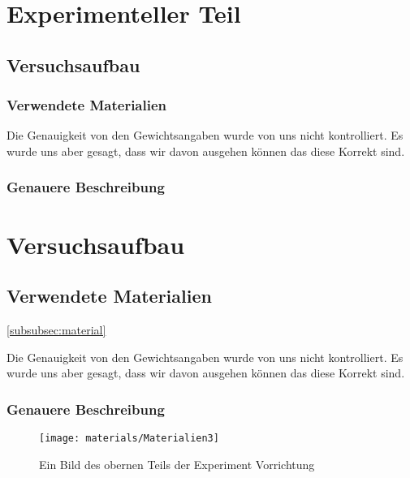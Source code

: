 \documentclass[../main.tex]{subfiles} %
\begin{document}
\section{Experimenteller Teil}\label{sec:experimenteller-teil}
    \subsection{Versuchsaufbau}\label{subsec:versuchsaufbau}
        \subsubsection{Verwendete Materialien}\label{subsubsec:zu-der-materialliste}
        \begin{tcolorbox}[title=Hinweis zu den Gewichtsangeben]
            Die Genauigkeit von den Gewichtsangaben wurde von uns nicht kontrolliert.
            Es wurde uns aber gesagt, dass wir davon ausgehen können das diese Korrekt sind.
        \end{tcolorbox}
        \subsubsection{Genauere Beschreibung}\label{subsubsec:materialien}

\section{Versuchsaufbau}\label{sec:versuchsaufbau}
    \subsection{Verwendete Materialien}\ref{subsubsec:material}\label{zu der Materialliste}
    \begin{tcolorbox}[title=Hinweis zu den Gewichtsangeben]
        Die Genauigkeit von den Gewichtsangaben wurde von uns nicht kontrolliert.
        Es wurde uns aber gesagt, dass wir davon ausgehen können das diese Korrekt sind.
    \end{tcolorbox}
    \subsubsection{Genauere Beschreibung}\label{subsubsec:materialien}

        \begin{figure}[H]
            \centering
            \texttt{[image: materials/Materialien3]}
            \caption{Ein Bild des obernen Teils der Experiment Vorrichtung  \textcolor{blue}{\underline{}}}
            \label{fig:material10}
        \end{figure}
\end{document}
